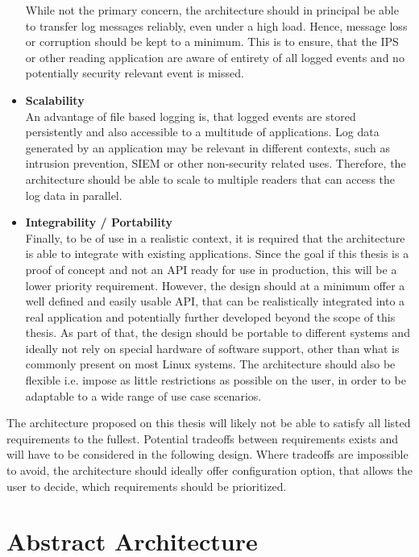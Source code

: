 \begin{itemize}
    While not the primary concern, the architecture should in principal be able to transfer log messages reliably, even under a high load. Hence, message loss or corruption 
    should be kept to a minimum. This is to ensure, that the \ac{IPS} or other reading application are aware of entirety of all logged events and no potentially security relevant event is missed. 
    \item \textbf{Scalability} \\
    An advantage of file based logging is, that logged events are stored persistently and also accessible to a multitude of applications. Log data generated by an application may be relevant in different
    contexts, such as intrusion prevention, \ac{SIEM} or other non-security related uses. Therefore, the architecture should be able to scale to multiple readers that can access the log data in parallel. 
    \item \textbf{Integrability / Portability} \\
    Finally, to be of use in a realistic context, it is required that the architecture is able to integrate with existing applications. Since the goal if this thesis is a proof of concept and not an 
    API ready for use in production, this will be a lower priority requirement. However, the design should at a minimum offer a well defined and easily usable API, that can be realistically integrated into a real application
    and potentially further developed beyond the scope of this thesis. As part of that, the design should be portable to different systems and ideally not rely on special hardware of software support, other than what
    is commonly present on most Linux systems. The architecture should also be flexible i.e. impose as little restrictions as possible on the user, in order to be adaptable to a wide range of use case scenarios.  

\end{itemize}

The architecture proposed on this thesis will likely not be able to satisfy all listed requirements to the fullest. Potential tradeoffs between requirements exists and will have to be considered in the following
design. Where tradeoffs are impossible to avoid, the architecture should ideally offer configuration option, that allows the user to decide, which requirements should be prioritized.       

\section{Abstract Architecture}

